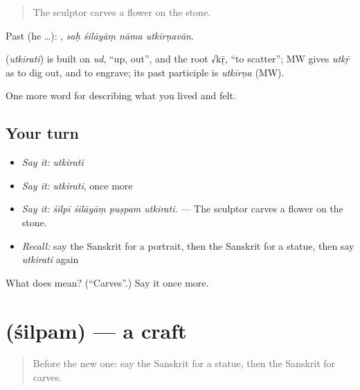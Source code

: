 \begin{quote}
The sculptor carves a flower on the stone.
\end{quote}

Past (he …):    , \emph{saḥ śilāyāṃ nāma utkīrṇavān}.

\begin{cousinweb}
\textbf{} (\emph{utkirati}) is built on \emph{ud}, \textquotedblleft{}up, out\textquotedblright{}, and the root √kṝ, \textquotedblleft{}to scatter\textquotedblright{}; MW gives \emph{utkṝ} as to dig out, and to engrave; its past participle is \emph{utkīrṇa} (MW).
\end{cousinweb}

\begin{grammarlens}[title={What you've built}]
One more word for describing what you lived and felt.
\end{grammarlens}

\subsection*{Your turn}
\begin{itemize}
\raggedright
  \item \emph{Say it:} \emph{utkirati}
  \item \emph{Say it:} \emph{utkirati}, once more
  \item \emph{Say it:} \emph{śilpī śilāyāṃ puṣpam utkirati.} — The sculptor carves a flower on the stone.
  \item \emph{Recall:} say the Sanskrit for a portrait, then the Sanskrit for a statue, then say \emph{utkirati} again
\end{itemize}

\begin{tcolorbox}[breakable,colback=teal!4,colframe=teal!35!black,title={Before you move on}]
What does  mean? (\textquotedblleft{}Carves\textquotedblright{}.) Say it once more.
\end{tcolorbox}
\section[\texorpdfstring{\sk{शिल्पम्} (śilpam)}{शिल्पम् (śilpam)}]{ (śilpam) — a craft}

\label{lesson:SA-C519-silpam}



\begin{quote}
Before the new one: say the Sanskrit for a statue, then the Sanskrit for carves.
\end{quote}

